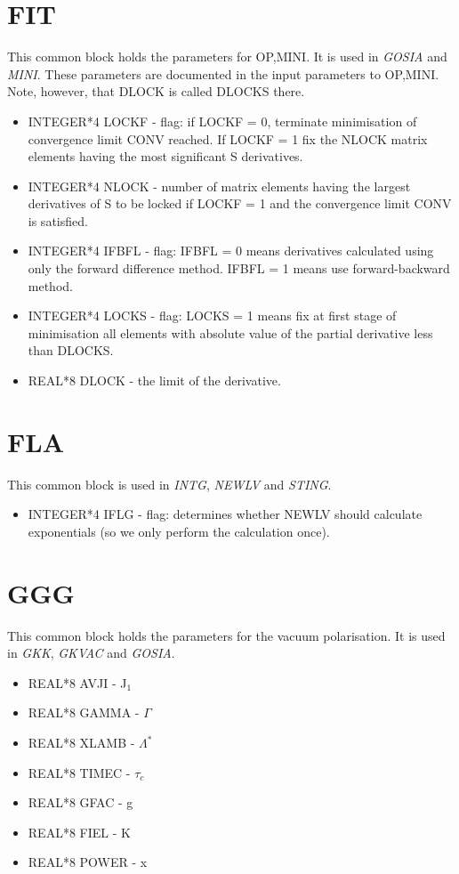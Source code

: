 \section{FIT}

This common block holds the parameters for OP,MINI. It is used in {\em
GOSIA} and {\em MINI}. These parameters are documented in the input
parameters to OP,MINI. Note, however, that DLOCK is called DLOCKS there.

\begin{itemize}
\item INTEGER*4 LOCKF - flag: if LOCKF = 0, terminate minimisation of convergence limit
CONV reached. If LOCKF = 1 fix the NLOCK matrix elements having the most
significant S derivatives.
\item INTEGER*4 NLOCK - number of matrix elements having the largest
derivatives of S to be locked if LOCKF = 1 and the convergence limit CONV is
satisfied.
\item INTEGER*4 IFBFL - flag: IFBFL = 0 means derivatives calculated using
only the forward difference method. IFBFL = 1 means use forward-backward
method.
\item INTEGER*4 LOCKS - flag: LOCKS = 1 means fix at first stage of
minimisation all elements with absolute value of the partial derivative less
than DLOCKS.
\item REAL*8 DLOCK - the limit of the derivative.
\end{itemize}

\section{FLA}

This common block is used in {\em INTG}, {\em NEWLV} and {\em STING}.

\begin{itemize}
\item INTEGER*4 IFLG - flag: determines whether {NEWLV} should calculate
exponentials (so we only perform the calculation once).
\end{itemize}

\section{GGG}

This common block holds the parameters for the vacuum polarisation. It is
used in {\em GKK}, {\em GKVAC} and {\em GOSIA}.

\begin{itemize}
\item REAL*8 AVJI - J$_1$
\item REAL*8 GAMMA - $\Gamma$
\item REAL*8 XLAMB - $\Lambda^*$
\item REAL*8 TIMEC - $\tau_c$
\item REAL*8 GFAC - g
\item REAL*8 FIEL - K
\item REAL*8 POWER - x
\end{itemize}

